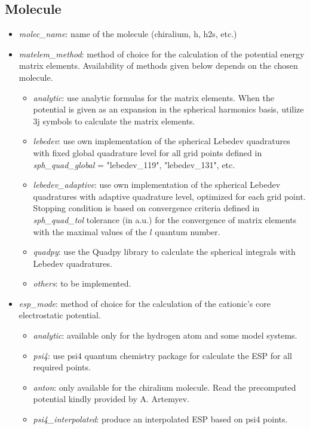 \documentclass[a4paper,american,floatfix,pdftex,superscriptaddress,twoside,%
aps,pra,
linenumbers,%
reprint,%
]{revtex4-2}%
\begin{document}
\subsection{Molecule}

\begin{itemize}
	\item \textit{molec\_name}: name of the molecule (chiralium, h, h2s, etc.)
	\item \textit{matelem\_method}: method of choice for the calculation of the potential energy matrix elements. Availability of methods given below depends on the chosen molecule.
	\begin{itemize}
		\item \textit{analytic}: use analytic formulas for the matrix elements. When the potential is given as an expansion in the spherical harmonics basis, utilize 3j symbols to calculate the matrix elements.
		\item \textit{lebedev}: use own implementation of the spherical Lebedev quadratures with fixed global quadrature level for all grid points defined in \textit{sph\_quad\_global} = "lebedev\_119", "lebedev\_131", etc.
		\item \textit{lebedev\_adaptive}: use own implementation of the spherical Lebedev quadratures with adaptive quadrature level, optimized for each grid point. Stopping condition is based on convergence criteria defined in \textit{sph\_quad\_tol} tolerance (in a.u.) for the convergence of matrix elements with the maximal values of the $l$ quantum number. 
		\item \textit{quadpy}: use the Quadpy library to calculate the spherical integrals with Lebedev quadratures.
		\item \textit{others}: to be implemented.
	\end{itemize}
	\item \textit{esp\_mode}: method of choice for the calculation of the cationic's core electrostatic potential.
	\begin{itemize}
		\item \textit{analytic}: available only for the hydrogen atom and some model systems. 
		\item \textit{psi4}: use psi4 quantum chemistry package for calculate the ESP for all required points.
		\item \textit{anton}: only available for the chiralium molecule. Read the precomputed potential kindly provided by A. Artemyev.
		\item \textit{psi4\_interpolated}: produce an interpolated ESP based on psi4 points.

\end{itemize}
\end{itemize}
\end{document}
